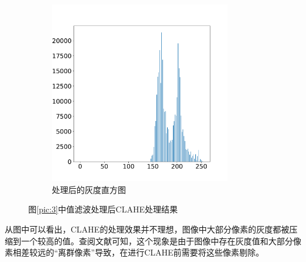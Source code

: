 \documentclass[a4paper]{ctexart}
\newcommand{\outwtwo}{0.4\textwidth}
\begin{document}
\begin{spacing}{1.35}
\begin{figure}[htbp]
		\begin{subfigure}[t]{\outwtwo}
			\centering
			\includegraphics[width=0.87\textwidth]{figure/3_img_clahe_1.pdf}
			\caption{处理后的灰度直方图}
		\end{subfigure}
		\caption{图\ref{pic:3}中值滤波处理后CLAHE处理结果}
		\label{fig:3blur_clahe}
	\end{figure}
	从图中可以看出，CLAHE的处理效果并不理想，图像中大部分像素的灰度都被压缩到一个较高的值。查阅文献可知，这个现象是由于图像中存在灰度值和大部分像素相差较远的“离群像素”导致，在进行CLAHE前需要将这些像素剔除\cite{RN154}。


\end{spacing}
\end{document}
